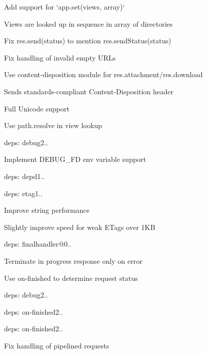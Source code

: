 \begin{DoxyItemize}
\item Add support for `app.set(\textquotesingle{}views\textquotesingle{}, array)`
\begin{DoxyItemize}
\item Views are looked up in sequence in array of directories
\end{DoxyItemize}
\item Fix {\ttfamily res.\+send(status)} to mention {\ttfamily res.\+send\+Status(status)}
\item Fix handling of invalid empty U\+R\+Ls
\item Use {\ttfamily content-\/disposition} module for {\ttfamily res.\+attachment}/{\ttfamily res.\+download}
\begin{DoxyItemize}
\item Sends standards-\/compliant {\ttfamily Content-\/\+Disposition} header
\item Full Unicode support
\end{DoxyItemize}
\item Use {\ttfamily path.\+resolve} in view lookup
\item deps\+: debug2..
\begin{DoxyItemize}
\item Implement {\ttfamily D\+E\+B\+U\+G\+\_\+\+F\+D} env variable support
\end{DoxyItemize}
\item deps\+: depd1..
\item deps\+: etag1..
\begin{DoxyItemize}
\item Improve string performance
\item Slightly improve speed for weak E\+Tags over 1\+K\+B
\end{DoxyItemize}
\item deps\+: finalhandler@0..
\begin{DoxyItemize}
\item Terminate in progress response only on error
\item Use {\ttfamily on-\/finished} to determine request status
\item deps\+: debug2..
\item deps\+: on-\/finished2..
\end{DoxyItemize}
\item deps\+: on-\/finished2..
\begin{DoxyItemize}
\item Fix handling of pipelined requests

\end{DoxyItemize}
\end{DoxyItemize}
